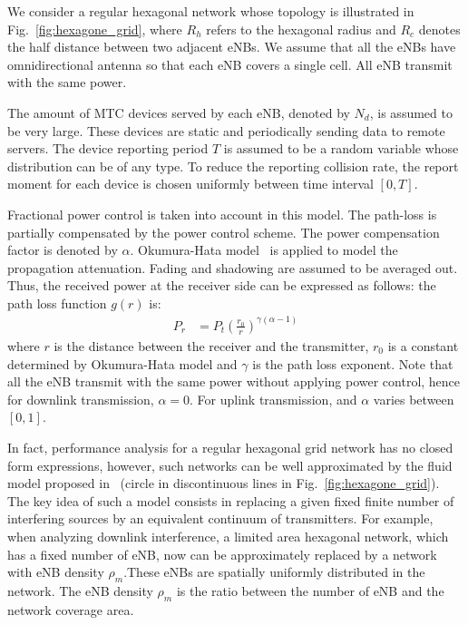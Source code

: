 We consider a regular hexagonal network whose topology is illustrated in Fig.~\ref{fig:hexagone_grid}, where $R_{h}$ refers to the hexagonal radius and $R_c$ denotes the half distance between two adjacent eNBs. We assume that all the eNBs have omnidirectional antenna so that each eNB covers a single cell. All eNB transmit with the same power.

The amount of MTC devices served by each eNB, denoted by $N_d$, is assumed to be very large. These devices are static and periodically sending data to remote servers. The device reporting period $T$ is assumed to be a random variable whose distribution can be of any type. To reduce the reporting collision rate, the report moment for each device is chosen uniformly between time interval $\left[ 0, T\right] $. 

Fractional power control is taken into account in this model. The path-loss is partially compensated by the power control scheme. The power compensation factor is denoted by $\alpha$. Okumura-Hata model~\cite{lagrange2000reseaux} is applied to model the propagation attenuation. Fading and shadowing are assumed to be averaged out. Thus, the received power at the receiver side can be expressed as follows: the path loss function $g(r)$ is:  
\begin{align}
P_r &= P_t \left( \frac{r_0}{r} \right) ^{\gamma(\alpha -1)} 
\end{align}
where $r$ is the distance between the receiver and the transmitter, $r_0$ is a constant determined by Okumura-Hata model and $\gamma$ is the path loss exponent. Note that all the eNB transmit with the same power without applying power control,  hence for downlink transmission, $\alpha = 0$. For uplink transmission, and $\alpha$ varies between $\left[ 0, 1\right]$.

In fact, performance analysis for a regular hexagonal grid network has no closed form expressions, however, such networks can be well approximated by the fluid model proposed in~\cite{kelif2010fluid} (circle in discontinuous lines in Fig.~\ref{fig:hexagone_grid}). The key idea of such a model consists in replacing a given fixed finite number of interfering sources by an equivalent continuum of transmitters. For example, when analyzing downlink interference, a limited area hexagonal network, which has a fixed number of eNB, now can be approximately replaced by a network with eNB density $\rho_{m}$.These eNBs are spatially uniformly distributed in the network. The eNB density $\rho_{m}$ is the ratio between the number of eNB and the network coverage area. 


